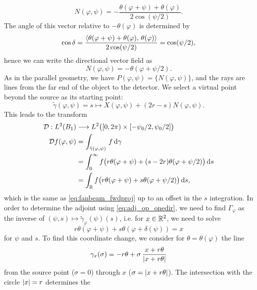 \documentclass{amsart}
\renewcommand*{\phi}{\varphi}
\begin{document}
\begin{example}
\begin{equation*}
  N(\phi,\psi) = - \frac{\theta(\phi + \psi) + \theta(\phi)}{2 \cos(\psi/2)}.
 \end{equation*}
 The angle of this vector relative to $-\theta(\phi)$ is determined by
 \begin{equation*}
  \cos\delta = \frac{\INNER{\theta(\phi + \psi) + \theta(\phi)}{\theta(\phi)}}{2 \cos(\psi/2)} = \cos(\psi/2),
 \end{equation*}
 hence we can write the directional vector field as
 \begin{equation}
  \label{eq:fanbeam_dir_field}
  N(\phi,\psi) = - \theta(\phi + \psi/2).
 \end{equation} 
 As in the parallel geometry, we have $P(\phi,\psi) = \lbrace N(\phi,\psi)\rbrace$, and the rays are lines from the far end of 
 the object to the detector. We select a virtual point beyond the source as its starting point:
 \begin{equation*}
  \tilde \gamma(\phi, \psi) = s \mapsto X(\phi,\psi) + (2r-s) N(\phi,\psi).
 \end{equation*}
 This leads to the transform
 \begin{align}
  \OPD: L^2(B_1) &\Lto L^2\big([0,2\pi) \times [-\psi_0/2, \psi_0/2]\big)\\
  \OPD f(\phi, \psi)
  &= \int_{\tilde \gamma(\phi,\psi)}\, f \, \D \gamma \notag \\
  &= \int_0^\infty f\big(r\theta(\phi + \psi) + (s-2r)\theta(\phi + \psi/2)\big)\, \D s \notag \\
  \label{eq:fanbeam_fwdproj_alt}
  &= \int_\RR f\big(r\theta(\phi + \psi) + s\theta(\phi + \psi/2)\big)\, \D s,
 \end{align}
 which is the same as \eqref{eq:fanbeam_fwdproj} up to an offset in the $s$ integration. In order to determine the adjoint using 
 \eqref{eq:adj_op_onedir}, we need to find $\Gamma_\phi$ as the inverse of $(\psi, s) \mapsto \tilde \gamma_\phi(\psi)(s)$, i.e. for $x \in 
 {\ensuremath{\mathbb{R}}}^2$, we need to solve
 \begin{equation*}
  r\theta(\phi + \psi) + s\theta(\phi + \delta(\psi)) = x
 \end{equation*}
 for $\psi$ and $s$. To find this coordinate change, we consider for $\theta=\theta(\phi)$ the line
 \begin{equation*}
  \gamma_x(\sigma) = -r\theta + \sigma\, \frac{x+r\theta}{|x + r \theta|}
 \end{equation*}
 from the source point ($\sigma=0$) through $x$ ($\sigma=|x+r\theta|$). The intersection with the circle $|x|=r$ determines the 

\end{example}
\end{document}
